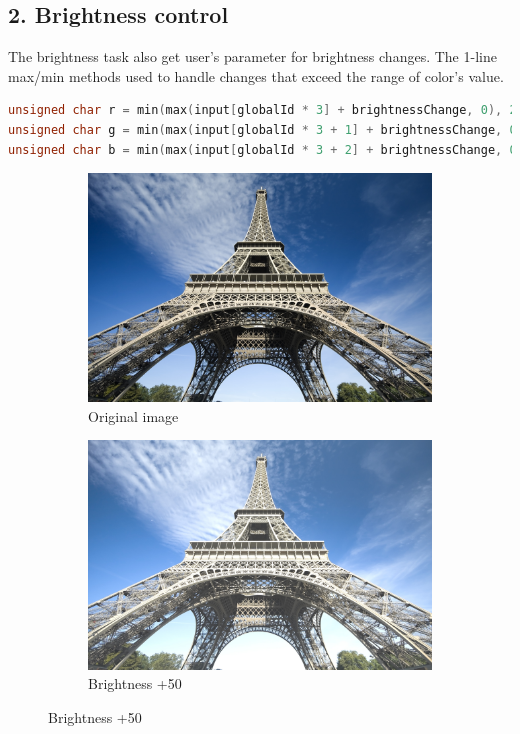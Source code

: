 \documentclass[12pt]{article}
\begin{document}
\subsection*{2. Brightness control}

The brightness task also get user's parameter for brightness changes. The 1-line max/min methods used to handle changes that exceed the range of color's value.

\begin{lstlisting}[language=C]
unsigned char r = min(max(input[globalId * 3] + brightnessChange, 0), 255);
unsigned char g = min(max(input[globalId * 3 + 1] + brightnessChange, 0), 255);
unsigned char b = min(max(input[globalId * 3 + 2] + brightnessChange, 0), 255);
\end{lstlisting}

\begin{figure}[H]
  \centering
  \begin{subfigure}{.45\textwidth}
    \includegraphics[width=\linewidth]{./img/origin.jpg}
    \caption{Original image}
  \end{subfigure}
  \hspace{1cm}
  \begin{subfigure}{.45\textwidth}
    \includegraphics[width=\linewidth]{./img/6b.jpg}
    \caption{Brightness +50}
  \end{subfigure}
\end{figure}
\end{document}
